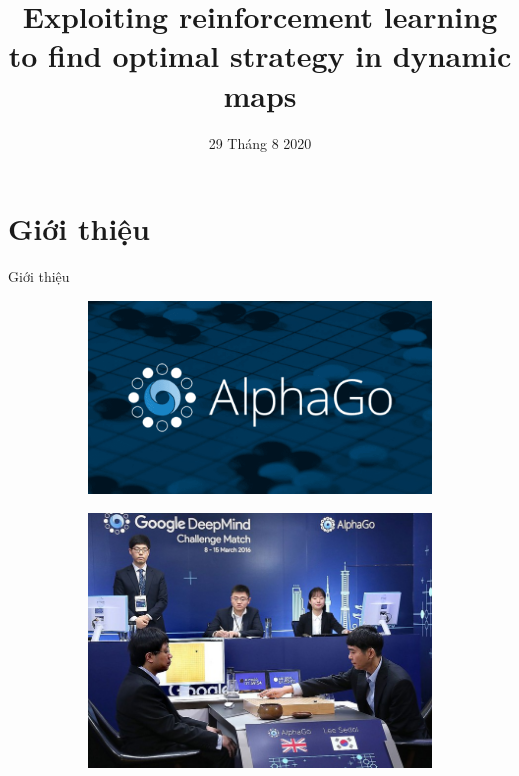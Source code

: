 \documentclass{beamer}
\title{Exploiting reinforcement learning to find optimal strategy in dynamic maps}
\author[Phan Quang Khánh]{%
\usebox{\authbox}
}
\institute[Unimib]{Đại học Khoa học Tự nhiên}
\date{29 Tháng 8 2020}
\begin{document}
\begin{frame}
\titlepage %
\end{frame}

\begin{frame}
\frametitle{}
\tableofcontents 
\end{frame}
\section{Giới thiệu}
\begin{frame}{Giới thiệu}
    \begin{figure}[ht]
        \begin{subfigure}{.48\textwidth}
          \centering
          \includegraphics[width=.8\linewidth]{Pic/slide/alpha-go.png}
        \end{subfigure}
        \begin{subfigure}{.48\textwidth}
          \centering
          \includegraphics[width=.8\linewidth]{Pic/slide/compete with alphago.jpg}
        \end{subfigure}
    \captionsetup{labelformat=empty}
    \label{fig:fig}
    \end{figure}
\end{frame}
\end{document}

